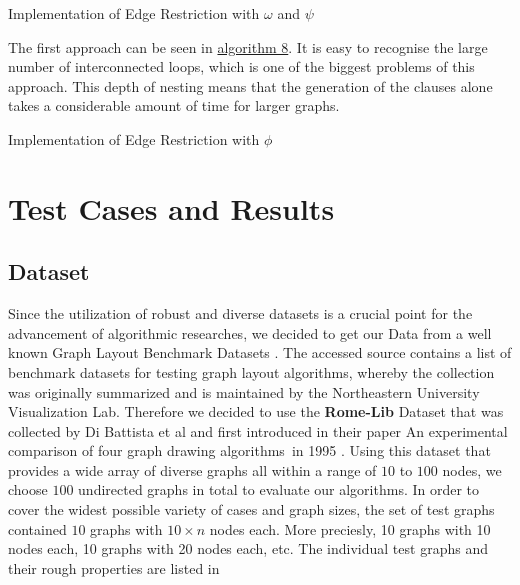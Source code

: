 \documentclass[bachelor, english]{algothesis}
\begin{document}
\begin{algorithm}[ht]
    \caption{Implementation of Edge Restriction with $\omega$ and $\psi$}
    \label{alg:edgeRestriction2.2}
\end{algorithm}
\noindent
The first approach can be seen in \hyperlink{alg:edgeRestriction1}{algorithm 8}. It is easy to recognise the large number of interconnected loops, which is one of the biggest problems of this approach. This depth of nesting means that the generation of the clauses alone takes a considerable amount of time for larger graphs.
\begin{algorithm}[ht]
    \caption{Implementation of Edge Restriction with $\phi$}
    \label{alg:edgeRestriction1}
\end{algorithm}

\section{Test Cases and Results}
\subsection{Dataset}
Since the utilization of robust and diverse datasets is a crucial point for the advancement of algorithmic researches, we decided to get our Data from a well known Graph Layout Benchmark Datasets \cite{Benchmark}. The accessed source contains a list of benchmark datasets for testing graph layout algorithms, whereby the collection was originally summarized and is maintained by the Northeastern University Visualization Lab. Therefore we decided to use the \textbf{Rome-Lib} Dataset that was collected by Di Battista et al and first introduced in their paper  \glqq An experimental comparison of four graph drawing algorithms\grqq \, in 1995 \cite{Rome_Lib}. Using this dataset that provides a wide array of diverse graphs all within a range of $10$ to $100$ nodes, we choose $100$ undirected graphs in total to evaluate our algorithms. In order to cover the widest possible variety of cases and graph sizes, the set of test graphs contained $10$ graphs with $10\times n$ nodes each. More preciesly, 10 graphs with 10 nodes each, 10 graphs with 20 nodes each, etc. The individual test graphs and their rough properties are listed in %
\\
\end{document}
